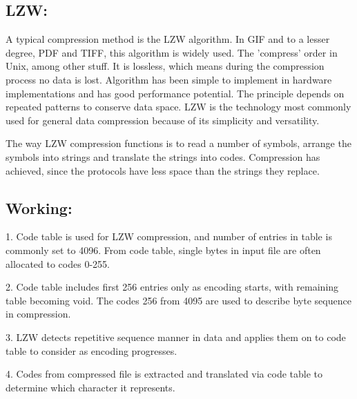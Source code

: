 \documentclass[a4paper, 12pt]{article}
\begin{document}
\subsection{LZW:}
\par A typical compression method is the LZW algorithm. In GIF and to a lesser 
degree, PDF and TIFF, this algorithm is widely used. The 'compress' order in 
Unix, among other stuff. It is lossless, which means during the compression 
process no data is lost. Algorithm has been simple to implement in hardware 
implementations and has good performance potential. The principle depends on 
repeated patterns to conserve data space. LZW is the technology most commonly 
used for general data compression because of its simplicity and versatility.
 \\
\par The way LZW compression functions is to read a number of symbols, arrange 
the symbols into strings and translate the strings into codes. Compression has
achieved, since the protocols have less space than the strings they replace.
\\

\subsection{ Working:}
\par 1. Code table is used for LZW compression, and number of entries in table is
commonly set to 4096. From code table, single bytes in input file are often 
allocated to codes 0-255.
\\
\par 2. Code table includes first 256 entries only as encoding starts, with remaining 
table becoming void. The codes 256 from 4095 are used to describe byte
sequence in compression.
\\
\par 3. LZW detects repetitive sequence manner in data and applies them on to code 
table to consider as encoding progresses.
\\
\par 4. Codes from compressed file is extracted and translated via code table to 
determine which character it represents.
\\
\end{document}
